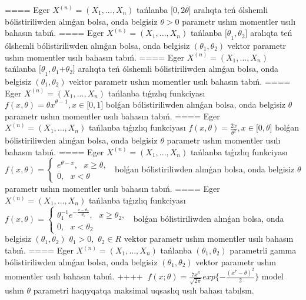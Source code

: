 ====
Eger \(X^{(n)} = \left( X_{1},...,X_{n} \right)\) tańlanba {[}\(0,2\theta\rbrack\) aralıqta teń ólshemli bólistiriliwden alınǵan bolsa, onda belgisiz \(\theta > 0\) parametr ushın momentler usılı bahasın tabıń.
====
Eger \(X^{(n)} = \left( X_{1},...,X_{n} \right)\) tańlanba \({\lbrack\theta}_{1},\theta_{2}\rbrack\) aralıqta teń ólshemli bólistiriliwden alınǵan bolsa, onda belgisiz \(\left( \theta_{1},\theta_{2} \right)\) vektor parametr ushın momentler usılı bahasın tabıń.
====
Eger \(X^{(n)} = \left( X_{1},...,X_{n} \right)\) tańlanba \({\lbrack\theta}_{1},\theta_{1}{+ \theta}_{2}\rbrack\) aralıqta teń ólshemli bólistiriliwden alınǵan bolsa, onda belgisiz \(\left( \theta_{1},\theta_{2} \right)\) vektor parametr ushın momentler usılı bahasın tabıń.
====
Eger \(X^{(n)} = \left( X_{1},...,X_{n} \right)\) tańlanba tıǵızlıq funkciyası
${f(x,\theta) = \theta x}^{\theta - 1},x \in \lbrack 0,1\rbrack$
bolǵan bólistiriliwden alınǵan bolsa, onda belgisiz \(\theta\) parametr ushın momentler usılı bahasın tabıń.
====
Eger \(X^{(n)} = \left( X_{1},...,X_{n} \right)\) tańlanba tıǵızlıq funkciyası
$f(x,\theta) = \frac{2x}{\theta^{2}},x \in \lbrack 0,\theta\rbrack$
bolǵan bólistiriliwden alınǵan bolsa, onda belgisiz \(\theta\) parametr ushın momentler usılı bahasın tabıń.
====
Eger \(X^{(n)} = \left( X_{1},...,X_{n} \right)\) tańlanba tıǵızlıq funkciyası
$
{f(x,\theta) = \left\{ \begin{array}{r}
e^{\theta - x},\ \ \ x \geq \theta, \\
0,\ \ \ x < \theta
\end{array} \right.\ }$
bolǵan bólistiriliwden alınǵan bolsa, onda belgisiz \(\theta\) parametr ushın momentler usılı bahasın tabıń.
====
Eger \(X^{(n)} = \left( X_{1},...,X_{n} \right)\) tańlanba tıǵızlıq funkciyası
$f(x,\theta) = \left\{ \begin{array}{r}
\theta_{1}^{- 1}e^{- \frac{x - \theta_{2}}{\theta_{1}}},\ \ \ x \geq \theta_{2}, \\
0,\ \ \ x < \theta_{2}
\end{array} \right.\ $
bolǵan bólistiriliwden alınǵan bolsa, onda belgisiz \(\left( \theta_{1},\theta_{2} \right)\) \(\theta_{1} > 0,\) \(\theta_{2} \in R\) vektor parametr ushın momentler usılı bahasın tabıń.
====
Eger \(X^{(n)} = \left( X_{1},...,X_{n} \right)\) tańlanba \(\left( \theta_{1},\theta_{2} \right)\) parametrli gamma bólistiriliwden alınǵan bolsa, onda belgisiz \(\left( \theta_{1},\theta_{2} \right)\) vektor parametr ushın momentler usılı bahasın tabıń.
++++
\(\ f(x;\theta) = \frac{7x^{6}}{\sqrt{2\pi}}exp\{ - \frac{(x^{7} - \theta)^{2}}{2}\}\) model ushın \(\theta\) parametri haqıyqatqa maksimal uqsaslıq usılı bahası tabılsın.
